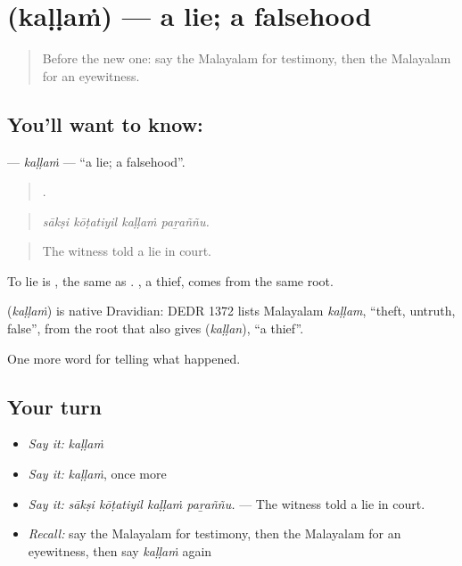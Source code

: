 \section[\texorpdfstring{\ml{കള്ളം} (kaḷḷaṁ)}{കള്ളം (kaḷḷaṁ)}]{ (kaḷḷaṁ) — a lie; a falsehood}

\label{lesson:ML-C370-kallam}



\begin{quote}
Before the new one: say the Malayalam for testimony, then the Malayalam for an eyewitness.
\end{quote}

\subsection*{You'll want to know: }
\textbf{} — \emph{kaḷḷaṁ} — \textquotedblleft{}a lie; a falsehood\textquotedblright{}.

\begin{quote}
   .
\end{quote}

\begin{quote}
\emph{sākṣi kōṭatiyil kaḷḷaṁ paṟaññu.}
\end{quote}

\begin{quote}
The witness told a lie in court.
\end{quote}

To lie is  , the same as  . , a thief, comes from the same root.

\begin{cousinweb}
\textbf{} (\emph{kaḷḷaṁ}) is native Dravidian: DEDR 1372 lists Malayalam \emph{kaḷḷam}, \textquotedblleft{}theft, untruth, false\textquotedblright{}, from the root that also gives  (\emph{kaḷḷan}), \textquotedblleft{}a thief\textquotedblright{}.
\end{cousinweb}

\begin{grammarlens}[title={What you've built}]
One more word for telling what happened.
\end{grammarlens}

\subsection*{Your turn}
\begin{itemize}
\raggedright
  \item \emph{Say it:} \emph{kaḷḷaṁ}
  \item \emph{Say it:} \emph{kaḷḷaṁ}, once more
  \item \emph{Say it:} \emph{sākṣi kōṭatiyil kaḷḷaṁ paṟaññu.} — The witness told a lie in court.
  \item \emph{Recall:} say the Malayalam for testimony, then the Malayalam for an eyewitness, then say \emph{kaḷḷaṁ} again
\end{itemize}

